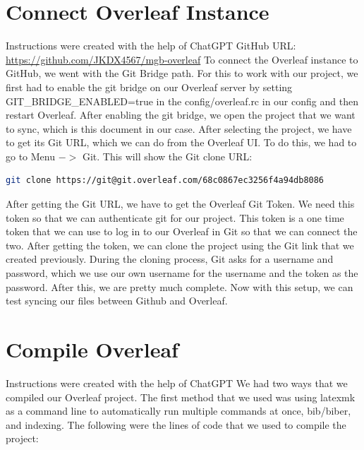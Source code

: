 \section{Connect Overleaf Instance}
Instructions were created with the help of ChatGPT
\newline \newline
GitHub URL: \href{https://github.com/JKDX4567/mgb-overleaf}{https://github.com/JKDX4567/mgb-overleaf}
\newline \newline
To connect the Overleaf instance to GitHub, we went with the Git Bridge path. For this to work with our project, we first had to enable the git bridge on our Overleaf server by setting GIT\_BRIDGE\_ENABLED=true in the config/overleaf.rc in our config and then restart Overleaf.
\newline \newline
After enabling the git bridge, we open the project that we want to sync, which is this document in our case.
\newline \newline
After selecting the project, we have to get its Git URL, which we can do from the Overleaf UI. To do this, we had to go to Menu $->$ Git. This will show the Git clone URL: 
\begin{lstlisting}[style=linuxstyle, language=bash]
git clone https://git@git.overleaf.com/68c0867ec3256f4a94db8086
\end{lstlisting}
\newline \newline
After getting the Git URL, we have to get the Overleaf Git Token. We need this token so that we can authenticate git for our project. This token is a one time token that we can use to log in to our Overleaf in Git so that we can connect the two.
\newline \newline
After getting the token, we can clone the project using the Git link that we created previously. During the cloning process, Git asks for a username and password, which we use our own username for the username and the token as the password.
\newline \newline
After this, we are pretty much complete. Now with this setup, we can test syncing our files between Github and Overleaf.

\section{Compile Overleaf}
Instructions were created with the help of ChatGPT
\newline \newline
We had two ways that we compiled our Overleaf project. The first method that we used was using latexmk as a command line to automatically run multiple commands at once, bib/biber, and indexing. The following were the lines of code that we used to compile the project:

